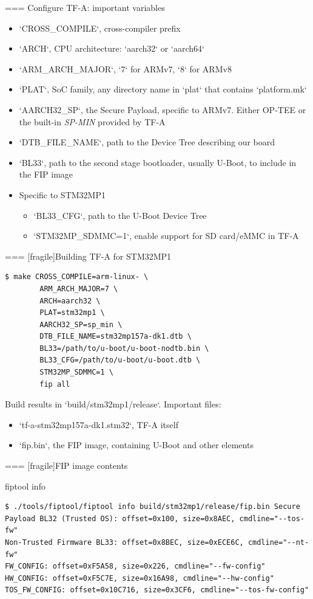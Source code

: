 === {Configure TF-A: important variables}
  \begin{itemize}
  \item `CROSS_COMPILE`, cross-compiler prefix
  \item `ARCH`, CPU architecture: `aarch32` or `aarch64`
  \item `ARM_ARCH_MAJOR`, `7` for ARMv7, `8` for ARMv8
  \item `PLAT`, SoC family, any directory name in `plat`
    that contains `platform.mk`
  \item `AARCH32_SP`, the Secure Payload, specific to
    ARMv7. Either OP-TEE or the built-in {\em SP-MIN} provided by TF-A
  \item `DTB_FILE_NAME`, path to the Device Tree describing our board
  \item `BL33`, path to the second stage bootloader, usually
    U-Boot, to include in the FIP image
  \item Specific to STM32MP1
    \begin{itemize}
    \item `BL33_CFG`, path to the U-Boot Device Tree
    \item `STM32MP_SDMMC=1`, enable support for SD card/eMMC in TF-A
    \end{itemize}
  \end{itemize}


=== [fragile]{Building TF-A for STM32MP1}
  \begin{block}{}
    {\footnotesize
\begin{verbatim}
$ make CROSS_COMPILE=arm-linux- \
        ARM_ARCH_MAJOR=7 \
        ARCH=aarch32 \
        PLAT=stm32mp1 \
        AARCH32_SP=sp_min \
        DTB_FILE_NAME=stm32mp157a-dk1.dtb \
        BL33=/path/to/u-boot/u-boot-nodtb.bin \
        BL33_CFG=/path/to/u-boot/u-boot.dtb \
        STM32MP_SDMMC=1 \
        fip all
\end{verbatim}
    }
  \end{block}

  Build results in `build/stm32mp1/release`. Important files:

  \begin{itemize}
  \item `tf-a-stm32mp157a-dk1.stm32`, TF-A itself
  \item `fip.bin`, the FIP image, containing U-Boot and other
    elements
  \end{itemize}


=== [fragile]{FIP image contents}
  \begin{block}{fiptool info}
    {\footnotesize
\begin{verbatim}
$ ./tools/fiptool/fiptool info build/stm32mp1/release/fip.bin Secure Payload BL32 (Trusted OS): offset=0x100, size=0x8AEC, cmdline="--tos-fw"
Non-Trusted Firmware BL33: offset=0x8BEC, size=0xECE6C, cmdline="--nt-fw"
FW_CONFIG: offset=0xF5A58, size=0x226, cmdline="--fw-config"
HW_CONFIG: offset=0xF5C7E, size=0x16A98, cmdline="--hw-config"
TOS_FW_CONFIG: offset=0x10C716, size=0x3CF6, cmdline="--tos-fw-config"
\end{verbatim}
    }
  \end{block}


